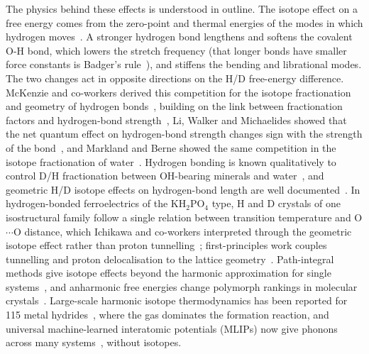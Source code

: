 \documentclass[aps,prmaterials,reprint,superscriptaddress,nofootinbib]{revtex4-2}
\begin{document}
The physics behind these effects is understood in outline. The isotope effect on a free energy comes from the zero-point and thermal energies of the modes in which hydrogen moves~\cite{Urey1947,Bigeleisen1947}. A stronger hydrogen bond lengthens and softens the covalent O-H bond, which lowers the stretch frequency (that longer bonds have smaller force constants is Badger's rule~\cite{Badger1934}), and stiffens the bending and librational modes. The two changes act in opposite directions on the H/D free-energy difference. McKenzie and co-workers derived this competition for the isotope fractionation and geometry of hydrogen bonds~\cite{McKenzie2014,McKenzie2015}, building on the link between fractionation factors and hydrogen-bond strength~\cite{Kreevoy1980}, Li, Walker and Michaelides showed that the net quantum effect on hydrogen-bond strength changes sign with the strength of the bond~\cite{Li2011}, and Markland and Berne showed the same competition in the isotope fractionation of water~\cite{Markland2012}. Hydrogen bonding is known qualitatively to control D/H fractionation between OH-bearing minerals and water~\cite{Suzuoki1976,Graham1980,Meheut2010,Reynard2009}, and geometric H/D isotope effects on hydrogen-bond length are well documented~\cite{Robertson1939,Ubbelohde1955,Ichikawa1978,Limbach2009}. In hydrogen-bonded ferroelectrics of the KH$_2$PO$_4$ type, H and D crystals of one isostructural family follow a single relation between transition temperature and O$\cdots$O distance, which Ichikawa and co-workers interpreted through the geometric isotope effect rather than proton tunnelling~\cite{Ichikawa1987}; first-principles work couples tunnelling and proton delocalisation to the lattice geometry~\cite{Koval2002}. Path-integral methods give isotope effects beyond the harmonic approximation for single systems~\cite{Ceriotti2013,Cheng2014,Ceriotti2016,Markland2018,Du2026}, and anharmonic free energies change polymorph rankings in molecular crystals~\cite{Rossi2016,Kapil2019,Kapil2022}. Large-scale harmonic isotope thermodynamics has been reported for 115 metal hydrides~\cite{Bourgeois2018}, where the gas dominates the formation reaction, and universal machine-learned interatomic potentials (MLIPs) now give phonons across many systems~\cite{Lee2024,Loew2025}, without isotopes.
\end{document}
